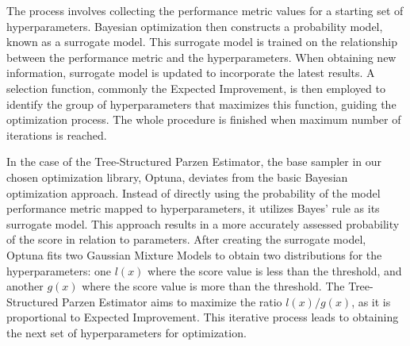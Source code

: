 The process involves collecting the performance metric values for a starting set of hyperparameters. Bayesian optimization then constructs a probability model, known as a surrogate model. This surrogate model is trained on the relationship between the performance metric and the hyperparameters. When obtaining new information, surrogate model is updated to incorporate the latest results. A selection function, commonly the Expected Improvement\cite{ament2024unexpected}, is then employed to identify the group of hyperparameters that maximizes this function, guiding the optimization process. The whole procedure is finished when maximum number of iterations is reached.

In the case of the Tree-Structured Parzen Estimator, the base sampler in our chosen optimization library, Optuna, deviates from the basic Bayesian optimization approach. Instead of directly using the probability of the model performance metric mapped to hyperparameters, it utilizes Bayes' rule as its surrogate model. This approach results in a more accurately assessed probability of the score in relation to parameters. After creating the surrogate model, Optuna fits two Gaussian Mixture Models to obtain two distributions for the hyperparameters: one $l(x)$ where the score value is less than the threshold, and another $g(x)$ where the score value is more than the threshold. The Tree-Structured Parzen Estimator aims to maximize the ratio $l(x)/g(x)$, as it is proportional to Expected Improvement. This iterative process leads to obtaining the next set of hyperparameters for optimization.

